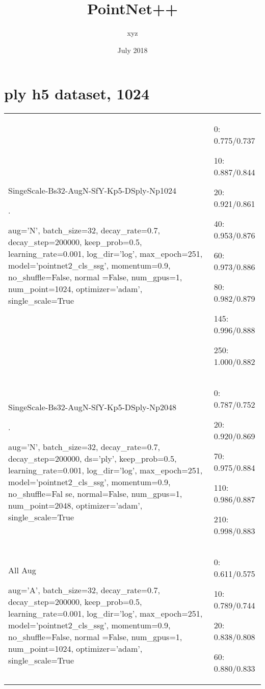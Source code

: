 \documentclass[,table,dvipsnames]{article}
\title{PointNet++}
\author{xyz}
\date{July 2018}
\begin{document}
\noindent
\begin{titlepage}
	\maketitle
\end{titlepage}	

\section{ply h5 dataset, 1024}
\noindent\begin{tabular}{|p{10cm}|p{5.5cm}| }	
\hline
\rowcolor{green!20}
SingeScale-Bs32-AugN-SfY-Kp5-DSply-Np1024\par . \par
aug='N', batch\_size=32, decay\_rate=0.7, decay\_step=200000, keep\_prob=0.5, learning\_rate=0.001, log\_dir='log', max\_epoch=251, model='pointnet2\_cls\_ssg', momentum=0.9, no\_shuffle=False, normal    =False, num\_gpus=1, num\_point=1024, optimizer='adam', single\_scale=True& 
0: 0.775/0.737\par 10: 0.887/0.844\par 20: 0.921/0.861\par 40: 0.953/0.876\par  60: 0.973/0.886\par 80: 0.982/0.879\par 145: 0.996/0.888\par 250: 1.000/0.882\\	

\rowcolor{red!20}
SingeScale-Bs32-AugN-SfY-Kp5-DSply-Np2048 \par .\par 
aug='N', batch\_size=32, decay\_rate=0.7, decay\_step=200000, ds='ply', keep\_prob=0.5, learning\_rate=0.001, log\_dir='log', max\_epoch=251, model='pointnet2\_cls\_ssg', momentum=0.9, no\_shuffle=Fal    se, normal=False, num\_gpus=1, num\_point=2048, optimizer='adam', single\_scale=True &
0: 0.787/0.752\par 20: 0.920/0.869\par 70: 0.975/0.884\par 110: 0.986/0.887 \par 210: 0.998/0.883\\


\rowcolor{green!20}
All Aug\par 
aug='A', batch\_size=32, decay\_rate=0.7, decay\_step=200000, keep\_prob=0.5, learning\_rate=0.001, log\_dir='log', max\_epoch=251, model='pointnet2\_cls\_ssg', momentum=0.9, no\_shuffle=False, normal    =False, num\_gpus=1, num\_point=1024, optimizer='adam', single\_scale=True& 
0: 0.611/0.575\par  10: 0.789/0.744\par 20: 0.838/0.808\par 60: 0.880/0.833\\

\hline 	
\end{tabular}
\end{document}
